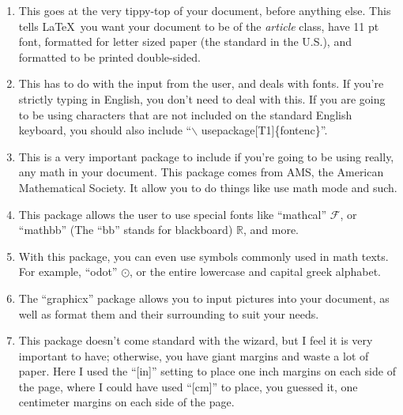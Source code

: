 \documentclass[11pt,letterpaper,twoside,titlepage]{article}
\newcommand{\latex}{\LaTeX \ }
\begin{document}
		\begin{enumerate}
		
			\item %
			
				This goes at the very tippy-top of your document, before anything else.  This tells \latex you want your document to be of the \emph{article} class, have 11 pt font, formatted for letter sized paper (the standard in the U.S.), and formatted to be printed double-sided.
				
			\item %
			
				This has to do with the input from the user, and deals with fonts.  If you're strictly typing in English, you don't need to deal with this.  If you are going to be using characters that are not included on the standard English keyboard, you should also include ``$\backslash$ usepackage[T1]\{fontenc\}''.
				
			\item %
			
				This is a very important package to include if you're going to be using really, any math in your document.  This package comes from AMS, the American Mathematical Society.  It allow you to do things like use math mode and such.
				
			\item %
			
				This package allows the user to use special fonts like ``mathcal'' $\mathcal{F}$, or ``mathbb'' (The ``bb'' stands for blackboard) $\mathbb{R}$, and more.
				
			\item %
			
				With this package, you can even use symbols commonly used in math texts.  For example, ``odot'' $\odot$, or the entire lowercase and capital greek alphabet.
				
			\item %
			
				The ``graphicx'' package allows you to input pictures into your document, as well as format them and their surrounding to suit your needs.
				
			\item %
			
				This package doesn't come standard with the wizard, but I feel it is very important to have; otherwise, you have giant margins and waste a lot of paper.  Here I used the ``[in]'' setting to place one inch margins on each side of the page, where I could have used ``[cm]'' to place, you guessed it, one centimeter margins on each side of the page.
		
		\end{enumerate}
	
\end{document}
